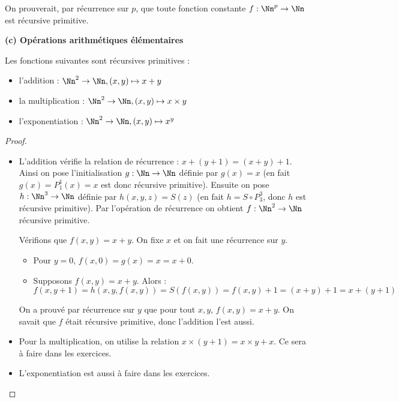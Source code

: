 \documentclass[11pt,class=report,crop=false]{standalone}
\begin{document}
\medskip

On prouverait, par récurrence sur $p$, que toute fonction constante $f : \Nn^p \to \Nn$ est récursive primitive.

\medskip

\textbf{(c) Opérations arithmétiques élémentaires}

\begin{proposition}
Les fonctions suivantes sont récursives primitives :
\begin{itemize}
    \item l'addition : $\Nn^2 \to \Nn, (x,y) \mapsto x+y$
    \item la multiplication : $\Nn^2 \to \Nn, (x,y) \mapsto x \times y$
    \item l'exponentiation : $\Nn^2 \to \Nn, (x,y) \mapsto x^y$
\end{itemize}
\end{proposition}

\begin{proof}
    ~
\begin{itemize}
    \item L'addition vérifie la relation de récurrence : $x+(y+1)=(x+y)+1$.
Ainsi on pose l'initialisation $g : \Nn \to \Nn$ définie par $g(x)=x$ (en fait $g(x)=P_1^1(x)=x$ est donc récursive primitive). Ensuite on pose $h : \Nn^3 \to \Nn$ définie par $h(x,y,z)=S(z)$ (en fait $h = S \circ P_3^3$, donc $h$ est récursive primitive).
Par l'opération de récurrence on obtient $f : \Nn^2 \to \Nn$ récursive primitive.

Vérifions que $f(x,y)=x+y$. On fixe $x$ et on fait une récurrence sur $y$.
\begin{itemize}
    \item Pour $y=0$, $f(x,0)=g(x)=x=x+0$.
    \item Supposons $f(x,y)=x+y$. Alors :
    \[ f(x,y+1) = h(x,y,f(x,y)) = S(f(x,y)) = f(x,y)+1 = (x+y)+1 = x+(y+1) \]
\end{itemize}

On a prouvé par récurrence sur $y$ que pour tout $x,y$, $f(x,y)=x+y$. On savait que $f$ était récursive primitive, donc l'addition l'est aussi.

    \item Pour la multiplication, on utilise la relation $x \times (y+1) = x \times y + x$. Ce sera à faire dans les exercices.

    \item L'exponentiation est aussi à faire dans les exercices.
\end{itemize}

\end{proof}
\end{document}
